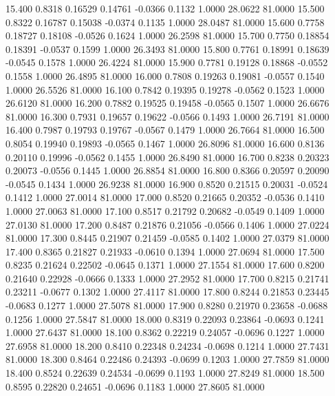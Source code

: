   15.400   0.8318   0.16529   0.14761  -0.0366   0.1132   1.0000  28.0622  81.0000
  15.500   0.8322   0.16787   0.15038  -0.0374   0.1135   1.0000  28.0487  81.0000
  15.600   0.7758   0.18727   0.18108  -0.0526   0.1624   1.0000  26.2598  81.0000
  15.700   0.7750   0.18854   0.18391  -0.0537   0.1599   1.0000  26.3493  81.0000
  15.800   0.7761   0.18991   0.18639  -0.0545   0.1578   1.0000  26.4224  81.0000
  15.900   0.7781   0.19128   0.18868  -0.0552   0.1558   1.0000  26.4895  81.0000
  16.000   0.7808   0.19263   0.19081  -0.0557   0.1540   1.0000  26.5526  81.0000
  16.100   0.7842   0.19395   0.19278  -0.0562   0.1523   1.0000  26.6120  81.0000
  16.200   0.7882   0.19525   0.19458  -0.0565   0.1507   1.0000  26.6676  81.0000
  16.300   0.7931   0.19657   0.19622  -0.0566   0.1493   1.0000  26.7191  81.0000
  16.400   0.7987   0.19793   0.19767  -0.0567   0.1479   1.0000  26.7664  81.0000
  16.500   0.8054   0.19940   0.19893  -0.0565   0.1467   1.0000  26.8096  81.0000
  16.600   0.8136   0.20110   0.19996  -0.0562   0.1455   1.0000  26.8490  81.0000
  16.700   0.8238   0.20323   0.20073  -0.0556   0.1445   1.0000  26.8854  81.0000
  16.800   0.8366   0.20597   0.20090  -0.0545   0.1434   1.0000  26.9238  81.0000
  16.900   0.8520   0.21515   0.20031  -0.0524   0.1412   1.0000  27.0014  81.0000
  17.000   0.8520   0.21665   0.20352  -0.0536   0.1410   1.0000  27.0063  81.0000
  17.100   0.8517   0.21792   0.20682  -0.0549   0.1409   1.0000  27.0130  81.0000
  17.200   0.8487   0.21876   0.21056  -0.0566   0.1406   1.0000  27.0224  81.0000
  17.300   0.8445   0.21907   0.21459  -0.0585   0.1402   1.0000  27.0379  81.0000
  17.400   0.8365   0.21827   0.21933  -0.0610   0.1394   1.0000  27.0694  81.0000
  17.500   0.8235   0.21624   0.22502  -0.0645   0.1371   1.0000  27.1554  81.0000
  17.600   0.8200   0.21640   0.22928  -0.0666   0.1333   1.0000  27.2952  81.0000
  17.700   0.8215   0.21741   0.23211  -0.0677   0.1302   1.0000  27.4117  81.0000
  17.800   0.8244   0.21853   0.23445  -0.0683   0.1277   1.0000  27.5078  81.0000
  17.900   0.8280   0.21970   0.23658  -0.0688   0.1256   1.0000  27.5847  81.0000
  18.000   0.8319   0.22093   0.23864  -0.0693   0.1241   1.0000  27.6437  81.0000
  18.100   0.8362   0.22219   0.24057  -0.0696   0.1227   1.0000  27.6958  81.0000
  18.200   0.8410   0.22348   0.24234  -0.0698   0.1214   1.0000  27.7431  81.0000
  18.300   0.8464   0.22486   0.24393  -0.0699   0.1203   1.0000  27.7859  81.0000
  18.400   0.8524   0.22639   0.24534  -0.0699   0.1193   1.0000  27.8249  81.0000
  18.500   0.8595   0.22820   0.24651  -0.0696   0.1183   1.0000  27.8605  81.0000

